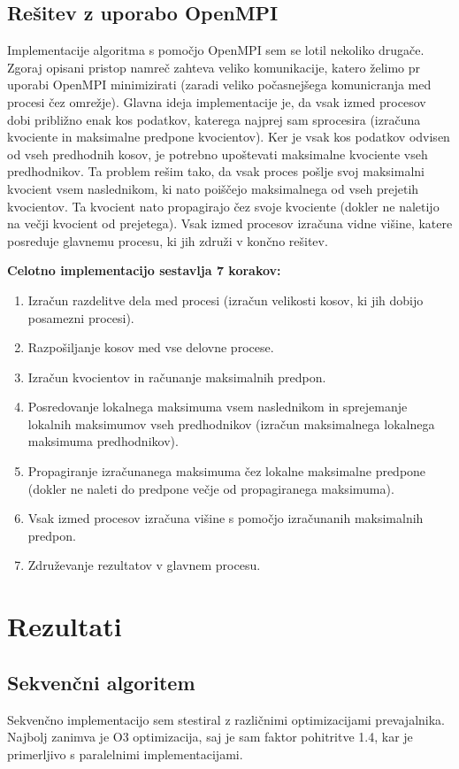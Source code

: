 \documentclass[a4paper,11pt]{article}
\begin{document}
\pagebreak
\subsection{Rešitev z uporabo OpenMPI}
Implementacije algoritma s pomočjo OpenMPI sem se lotil nekoliko drugače. Zgoraj opisani pristop namreč zahteva veliko komunikacije, katero želimo pr uporabi OpenMPI minimizirati (zaradi veliko počasnejšega komunicranja med procesi čez omrežje). Glavna ideja implementacije je, da vsak izmed procesov dobi približno enak kos podatkov, katerega najprej sam sprocesira (izračuna kvociente in maksimalne predpone kvocientov). Ker je vsak kos podatkov odvisen od vseh predhodnih kosov, je potrebno upoštevati maksimalne kvociente vseh predhodnikov. Ta problem rešim tako, da vsak proces pošlje svoj maksimalni kvocient vsem naslednikom, ki nato poiščejo maksimalnega od vseh prejetih kvocientov. Ta kvocient nato propagirajo čez svoje kvociente (dokler ne naletijo na večji kvocient od prejetega). Vsak izmed procesov izračuna vidne višine, katere posreduje glavnemu procesu, ki jih združi v končno rešitev.

\noindent
\textbf{Celotno implementacijo sestavlja 7 korakov:}
\begin{enumerate}
\item Izračun razdelitve dela med procesi (izračun velikosti kosov, ki jih dobijo posamezni procesi).
\item Razpošiljanje kosov med vse delovne procese.
\item Izračun kvocientov in računanje maksimalnih predpon.
\item Posredovanje lokalnega maksimuma vsem naslednikom in sprejemanje lokalnih maksimumov vseh predhodnikov (izračun maksimalnega lokalnega maksimuma predhodnikov).
\item Propagiranje izračunanega maksimuma čez lokalne maksimalne predpone (dokler ne naleti do predpone večje od propagiranega maksimuma).
\item Vsak izmed procesov izračuna višine s pomočjo izračunanih maksimalnih predpon.
\item Združevanje rezultatov v glavnem procesu.
\end{enumerate}
\section{Rezultati}

\subsection{Sekvenčni algoritem}
Sekvenčno implementacijo sem stestiral z različnimi optimizacijami prevajalnika. Najbolj zanimva je O3 optimizacija, saj je sam faktor pohitritve 1.4, kar je primerljivo s paralelnimi implementacijami.
\end{document}
